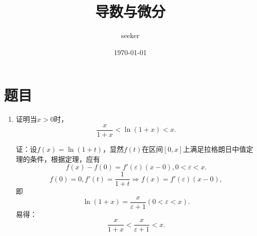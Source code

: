\documentclass[UTF8]{ctexart}
\title{导数与微分}
\author{seeker}
\date{\today}
\begin{document}
	\maketitle
	\section{题目}
	\begin{enumerate}
		\item 证明当$x>0$时，
		$$
		\frac{x}{1+x}<\ln(1+x)<x.
		$$
		
		证：设$f(x)=\ln(1+t)$，显然$f(t)$在区间$[0,x]$上满足拉格朗日中值定理的条件，根据定理，应有
		$$
		f(x)-f(0)=f'(\varepsilon)(x-0),0<\varepsilon<x.
		$$
		$$
		f(0)=0,f'(t)=\frac{1}{1+t}\Rightarrow f(x)=f'(\varepsilon)(x-0),
		$$
		即
		$$
		\ln(1+x)=\frac{x}{\varepsilon+1}(0<\varepsilon<x).
		$$
		易得：
		$$
		\frac{x}{1+x}<\frac{x}{\varepsilon+1}<x.
		$$
		
	\end{enumerate}
	
\end{document}
